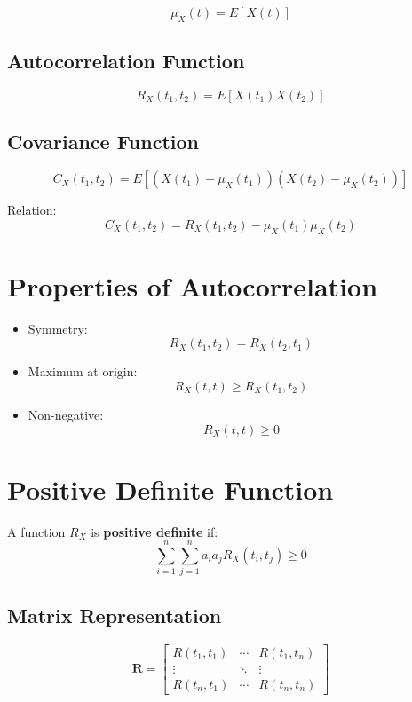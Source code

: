 \documentclass[11pt]{article}
\begin{document}
\[
\mu_X(t) = E[X(t)]
\]

\subsection{Autocorrelation Function}

\[
R_X(t_1, t_2) = E[X(t_1)X(t_2)]
\]

\subsection{Covariance Function}

\[
C_X(t_1, t_2) = E[(X(t_1) - \mu_X(t_1))(X(t_2) - \mu_X(t_2))]
\]

Relation:
\[
C_X(t_1,t_2) = R_X(t_1,t_2) - \mu_X(t_1)\mu_X(t_2)
\]

\section{Properties of Autocorrelation}

\begin{itemize}
    \item Symmetry:
    \[
    R_X(t_1,t_2) = R_X(t_2,t_1)
    \]
    
    \item Maximum at origin:
    \[
    R_X(t,t) \geq R_X(t_1,t_2)
    \]
    
    \item Non-negative:
    \[
    R_X(t,t) \geq 0
    \]
\end{itemize}

\section{Positive Definite Function}

A function $R_X$ is \textbf{positive definite} if:
\[
\sum_{i=1}^{n} \sum_{j=1}^{n} a_i a_j R_X(t_i, t_j) \geq 0
\]

\subsection{Matrix Representation}

\[
\mathbf{R} =
\begin{bmatrix}
R(t_1,t_1) & \cdots & R(t_1,t_n) \\
\vdots & \ddots & \vdots \\
R(t_n,t_1) & \cdots & R(t_n,t_n)
\end{bmatrix}
\]
\end{document}
